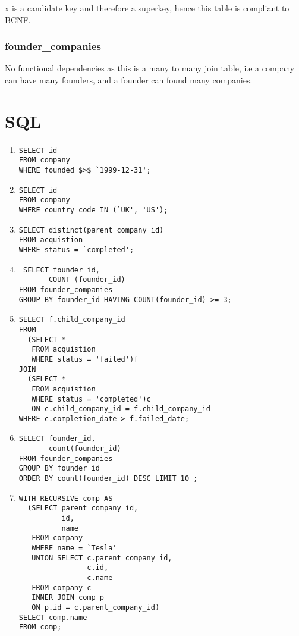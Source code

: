 \documentclass[12pt]{article}
\begin{document}
x is a candidate key and therefore a superkey, hence this table is compliant to BCNF.

\subsubsection{founder\_companies}
No functional dependencies as this is a many to many join table, i.e a company can have many founders, and a founder can found many companies.


\section{SQL}
\begin{enumerate}

 \item\label{part1}\begin{verbatim}SELECT id
FROM company
WHERE founded $>$ `1999-12-31';\end{verbatim}

  \item\label{part1}\begin{verbatim}SELECT id
FROM company
WHERE country_code IN (`UK', 'US');\end{verbatim}
  \item\label{part1}\begin{verbatim}SELECT distinct(parent_company_id)
FROM acquistion
WHERE status = `completed';\end{verbatim}
  \item\label{part1}\begin{verbatim} SELECT founder_id,
       COUNT (founder_id)
FROM founder_companies
GROUP BY founder_id HAVING COUNT(founder_id) >= 3;\end{verbatim}
  \item\label{part1}\begin{verbatim}SELECT f.child_company_id
FROM
  (SELECT *
   FROM acquistion
   WHERE status = 'failed')f
JOIN
  (SELECT *
   FROM acquistion
   WHERE status = 'completed')c
   ON c.child_company_id = f.child_company_id
WHERE c.completion_date > f.failed_date;\end{verbatim}
  \item\label{part1}\begin{verbatim}SELECT founder_id,
       count(founder_id)
FROM founder_companies
GROUP BY founder_id
ORDER BY count(founder_id) DESC LIMIT 10 ;\end{verbatim}
  \item\label{part1}\begin{verbatim}WITH RECURSIVE comp AS
  (SELECT parent_company_id,
          id,
          name
   FROM company
   WHERE name = `Tesla'
   UNION SELECT c.parent_company_id,
                c.id,
                c.name
   FROM company c
   INNER JOIN comp p
   ON p.id = c.parent_company_id)
SELECT comp.name
FROM comp;\end{verbatim}
\end{enumerate}
\end{document}
